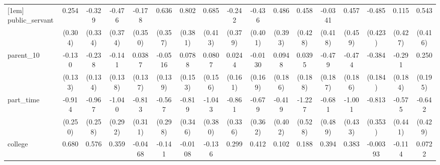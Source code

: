 {\begin{tabular}{l*{16}{c}}
[1em]
public\_servant      &       0.254         &      -0.329         &      -0.476         &      -0.178         &       0.636         &       0.802\sym{*}  &       0.685         &      -0.242         &      -0.436         &       0.486         &       0.458         &     -0.0341         &       0.457         &      -0.485         &       0.115         &       0.543         \\
                    &     (0.304)         &     (0.334)         &     (0.374)         &     (0.350)         &     (0.357)         &     (0.381)         &     (0.413)         &     (0.379)         &     (0.401)         &     (0.393)         &     (0.428)         &     (0.418)         &     (0.459)         &     (0.423)         &     (0.427)         &     (0.416)         \\
[1em]
parent\_10           &      -0.130         &      -0.238         &      -0.141         &      0.0387         &     -0.0516         &      0.0788         &      0.0807         &      0.0244         &     -0.0130         &      0.0948         &      0.0395         &      -0.479\sym{*}  &      -0.474\sym{*}  &      -0.384\sym{*}  &      -0.291         &       0.250         \\
                    &     (0.133)         &     (0.134)         &     (0.138)         &     (0.137)         &     (0.139)         &     (0.153)         &     (0.156)         &     (0.161)         &     (0.169)         &     (0.186)         &     (0.188)         &     (0.187)         &     (0.186)         &     (0.184)         &     (0.184)         &     (0.195)         \\
[1em]
part\_time           &      -0.914\sym{***}&      -0.967\sym{***}&      -1.040\sym{***}&      -0.813\sym{**} &      -0.567         &      -0.819\sym{*}  &      -1.043\sym{**} &      -0.861\sym{*}  &      -0.679         &      -0.419         &      -1.227\sym{*}  &      -0.681         &      -1.001\sym{*}  &      -0.813\sym{*}  &      -0.575         &      -0.642         \\
                    &     (0.250)         &     (0.258)         &     (0.292)         &     (0.311)         &     (0.298)         &     (0.346)         &     (0.380)         &     (0.336)         &     (0.362)         &     (0.402)         &     (0.528)         &     (0.489)         &     (0.433)         &     (0.353)         &     (0.441)         &     (0.429)         \\
[1em]
college             &       0.680\sym{***}&       0.576\sym{**} &       0.359         &     -0.0468         &      -0.141         &     -0.0108         &      -0.136         &       0.299         &       0.412         &       0.102         &       0.188         &       0.394         &       0.383         &    -0.00393         &      -0.114         &      0.0722         \\

\end{tabular}}
